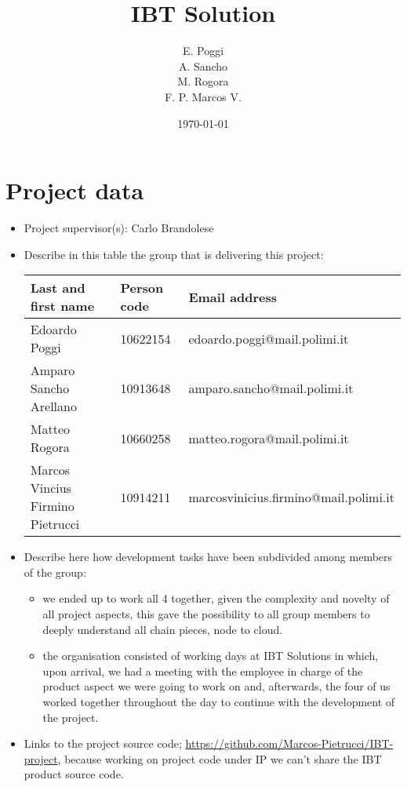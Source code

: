 \documentclass[10pt,a4]{article}
\author{
    E. Poggi\\
    A. Sancho\\
    M. Rogora \\
    F. P. Marcos V.\\
}
\date{\today}
\title{IBT Solution}
\begin{document}
\maketitle
\tableofcontents


\section{Project data}

\begin{itemize}
\item 
  Project supervisor(s): Carlo Brandolese

\item 
Describe in this table the group that is delivering this project:

\begin{center}
\begin{tabular}{lll}
Last and first name & Person code & Email address\\
\hline
  Edoardo Poggi & 10622154 & edoardo.poggi@mail.polimi.it \\
  Amparo Sancho Arellano & 10913648 & amparo.sancho@mail.polimi.it \\
  Matteo Rogora & 10660258 & matteo.rogora@mail.polimi.it\\
  Marcos Vincius Firmino Pietrucci & 10914211 & marcosvinicius.firmino@mail.polimi.it
\end{tabular}
\end{center}

\item
Describe here how development tasks have been subdivided among members
of the group:

\begin{itemize}
\item we ended up to work all 4 together, given the complexity and novelty of all project aspects, this gave the possibility to all group members to deeply understand all chain pieces, node to cloud.
\item the organisation consisted of working days at IBT Solutions in which, upon arrival, we had a meeting with the employee in charge of the product aspect we were going to work on and, afterwards, the four of us worked together throughout the day to continue with the development of the project.
\end{itemize}

\item Links to the project source code; \url{https://github.com/Marcos-Pietrucci/IBT-project}, because working on project code under IP we can't share the IBT product source code.

\end{itemize}
\end{document}
